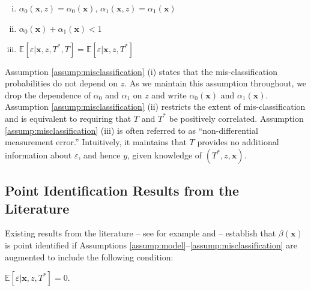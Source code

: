 \begin{assump} \mbox{}
  \label{assump:misclassification}
  \begin{enumerate}[(i)] 
    \item $\alpha_0(\mathbf{x},z) = \alpha_0(\mathbf{x})$,   $\alpha_1(\mathbf{x},z) = \alpha_1(\mathbf{x})$
    \item $\alpha_0(\mathbf{x}) + \alpha_1(\mathbf{x}) <1$ 
    \item $\mathbb{E}[\varepsilon|\mathbf{x},z,T^*,T] = \mathbb{E}[\varepsilon|\mathbf{x},z, T^*]$
  \end{enumerate}
\end{assump}

Assumption \ref{assump:misclassification} (i) states that the mis-classification probabilities do not depend on $z$.
As we maintain this assumption throughout, we drop the dependence of $\alpha_0$ and $\alpha_1$ on $z$ and write $\alpha_0(\mathbf{x})$ and $\alpha_1(\mathbf{x})$.
Assumption \ref{assump:misclassification} (ii) restricts the extent of mis-classification and is equivalent to requiring that $T$ and $T^*$ be positively correlated.
Assumption \ref{assump:misclassification} (iii) is often referred to as ``non-differential measurement error.''
Intuitively, it maintains that $T$ provides no additional information about $\varepsilon$, and hence $y$, given knowledge of $(T^*,z,\mathbf{x})$.

\subsection{Point Identification Results from the Literature}
\label{sec:ident_literature}

Existing results from the literature -- see for example \cite{FL} and \cite{Mahajan} -- establish that $\beta(\mathbf{x})$ is point identified if Assumptions \ref{assump:model}--\ref{assump:misclassification} are augmented to include the following condition:
\begin{assump} \mbox{}
  \label{assump:jointExog}
    $\mathbb{E}[\varepsilon|\mathbf{x},z, T^*] = 0$.
\end{assump}

